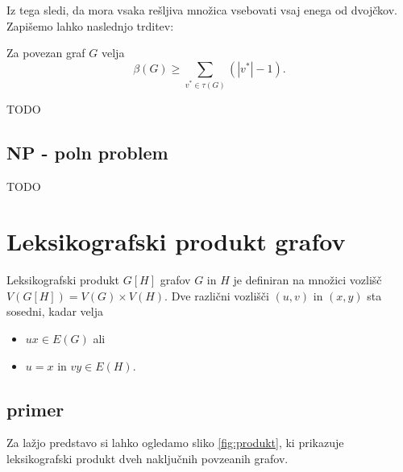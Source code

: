\documentclass[mat1, tisk]{fmfdelo}
\begin{document}
Iz tega sledi, da mora vsaka rešljiva množica vsebovati vsaj enega od dvojčkov.
Zapišemo lahko naslednjo trditev:

\begin{trditev} \label{trd:meja_mdim_dvojcki}
    Za povezan graf $G$ velja
    $$\beta(G) \geq \sum_{v^{*} \in \tau(G)} (|v^{*}| - 1).$$
\end{trditev}

\begin{dokaz}
    TODO
\end{dokaz}

\subsection{NP - poln problem}
TODO




\section{Leksikografski produkt grafov}\label{s:leks_prod}


\begin{definicija} \label{def:leks_prod}
    Leksikografski produkt $G[H]$ grafov $G$ in $H$ je definiran na množici vozlišč 
    $V (G[H]) = V (G)\times V (H)$. Dve različni vozlišči $(u, v)$ in $(x, y)$ sta 
    sosedni, kadar velja
\begin{itemize}
    \item $ux \in E(G)$ ali
    \item $u = x$ in $vy \in E(H).$ 
\end{itemize}
\end{definicija}




\subsection{primer} 
Za lažjo predstavo si lahko ogledamo sliko \ref{fig:produkt}, ki prikazuje leksikografski produkt
dveh naključnih povzeanih grafov.
\end{document}
